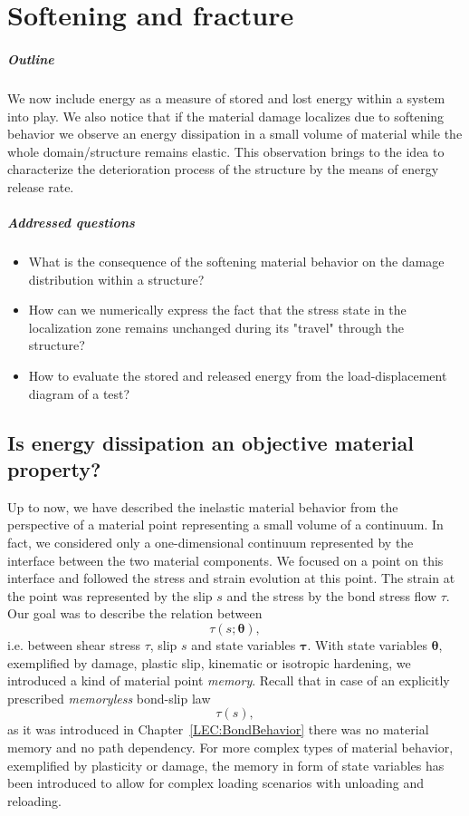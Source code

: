 \documentclass[main.tex]{subfiles}
\begin{document}
\chapter{Softening and fracture}
\label{LEC:SofteningFracture}

\paragraph{Outline}
We now include energy as a measure of stored and lost energy within a system into play. We also notice that if the material damage localizes due to softening behavior we observe an energy dissipation in a small volume of material while the whole domain/structure remains elastic. This observation brings to the idea to characterize the deterioration process of the structure by the means of energy release rate.

\paragraph{Addressed questions}
\begin{itemize}
    \item What is the consequence of the softening material behavior on the damage distribution within a structure?
    \item How can we numerically express the fact that the stress state in the localization zone remains unchanged during its "travel" through the structure?
    \item How to evaluate the stored and released energy from the load-displacement diagram of a test? 
\end{itemize}

\section{Is energy dissipation an objective material property?}

Up to now, we have described the inelastic material behavior from the perspective of a material point
representing a small volume of a continuum.
In fact, we considered only a one-dimensional continuum represented by the interface between the two material components. We focused on a point on this interface and followed the stress and strain evolution at this point. 
The strain at the point was represented by the slip $s$ and the stress by the bond stress flow $\tau$.
Our goal was to describe the relation between 
\[
\tau(s; \boldsymbol{\theta}),
\]
i.e. between shear stress $\tau$, slip $s$  and state variables $\boldsymbol{\tau}$.
With state variables $\boldsymbol{\theta}$, exemplified by damage, plastic slip, kinematic or isotropic hardening, 
we introduced a kind of material point \textit{memory}.
Recall that in case of an explicitly prescribed \textit{memoryless} bond-slip law 
\[
\tau(s),
\]
as it was introduced in Chapter~\ref{LEC:BondBehavior}
there was no material memory and no path dependency. 
For more complex types of material behavior, exemplified by plasticity or damage, 
the memory in form of state variables has  been introduced to allow for  complex loading scenarios with unloading and reloading.
\end{document}
